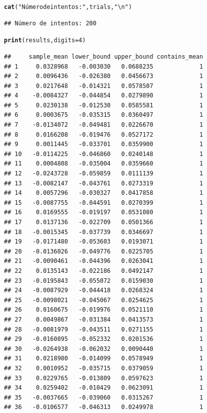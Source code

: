 \documentclass[12pt]{article}\usepackage[]{graphicx}\usepackage[]{xcolor}
\makeatletter
\newcommand{\hlnum}[1]{\textcolor[rgb]{0.686,0.059,0.569}{#1}}%
\newcommand{\hlsng}[1]{\textcolor[rgb]{0.192,0.494,0.8}{#1}}%
\newcommand{\hldef}[1]{\textcolor[rgb]{0.345,0.345,0.345}{#1}}%
\newcommand{\hlkwc}[1]{\textcolor[rgb]{0.333,0.667,0.333}{#1}}%
\newcommand{\hlkwd}[1]{\textcolor[rgb]{0.737,0.353,0.396}{\textbf{#1}}}%
\newenvironment{kframe}{%
 \def\at@end@of@kframe{}%
 \ifinner\ifhmode%
  \def\at@end@of@kframe{\end{minipage}}%
  \begin{minipage}{\columnwidth}%
 \fi\fi%
 \def\FrameCommand##1{\hskip\@totalleftmargin \hskip-\fboxsep
 \colorbox{shadecolor}{##1}\hskip-\fboxsep
     \hskip-\linewidth \hskip-\@totalleftmargin \hskip\columnwidth}%
 \MakeFramed {\advance\hsize-\width
   \@totalleftmargin\z@ \linewidth\hsize
   \@setminipage}}%
 {\par\unskip\endMakeFramed%
 \at@end@of@kframe}
\newenvironment{knitrout}{}{} %
\makeatother
\begin{document}
\begin{knitrout}
\begin{kframe}
\begin{alltt}
\hlkwd{cat}\hldef{(}\hlsng{"Número de intentos:"}\hldef{, trials,} \hlsng{"\textbackslash{}n"}\hldef{)}
\end{alltt}
\begin{verbatim}
## Número de intentos: 200
\end{verbatim}
\begin{alltt}
\hlkwd{print}\hldef{(results,} \hlkwc{digits}\hldef{=} \hlnum{4}\hldef{)}
\end{alltt}
\begin{verbatim}
##     sample_mean lower_bound upper_bound contains_mean
## 1     0.0328968   -0.003030   0.0688235             1
## 2     0.0096436   -0.026380   0.0456673             1
## 3     0.0217648   -0.014321   0.0578507             1
## 4    -0.0084327   -0.044854   0.0279890             1
## 5     0.0230138   -0.012530   0.0585581             1
## 6     0.0003675   -0.035315   0.0360497             1
## 7    -0.0134072   -0.049481   0.0226670             1
## 8     0.0166208   -0.019476   0.0527172             1
## 9     0.0011445   -0.033701   0.0359900             1
## 10   -0.0114225   -0.046860   0.0240148             1
## 11    0.0004808   -0.035004   0.0359660             1
## 12   -0.0243728   -0.059859   0.0111139             1
## 13   -0.0082147   -0.043761   0.0273319             1
## 14    0.0057296   -0.030327   0.0417858             1
## 15   -0.0087755   -0.044591   0.0270399             1
## 16    0.0169555   -0.019197   0.0531080             1
## 17    0.0137136   -0.022709   0.0501366             1
## 18   -0.0015345   -0.037739   0.0346697             1
## 19   -0.0171480   -0.053603   0.0193071             1
## 20   -0.0136026   -0.049776   0.0225705             1
## 21   -0.0090461   -0.044396   0.0263041             1
## 22    0.0135143   -0.022186   0.0492147             1
## 23   -0.0195843   -0.055072   0.0159030             1
## 24   -0.0087929   -0.044418   0.0268324             1
## 25   -0.0098021   -0.045067   0.0254625             1
## 26    0.0160675   -0.019976   0.0521110             1
## 27    0.0049867   -0.031384   0.0413573             1
## 28   -0.0081979   -0.043511   0.0271155             1
## 29   -0.0160895   -0.052332   0.0201536             1
## 30   -0.0264938   -0.062032   0.0090440             1
## 31    0.0218980   -0.014099   0.0578949             1
## 32    0.0010952   -0.035715   0.0379059             1
## 33    0.0229765   -0.013809   0.0597623             1
## 34    0.0259402   -0.010429   0.0623091             1
## 35   -0.0037665   -0.039060   0.0315267             1
## 36   -0.0106577   -0.046313   0.0249978             1

\end{verbatim}
\end{kframe}
\end{knitrout}
\end{document}
